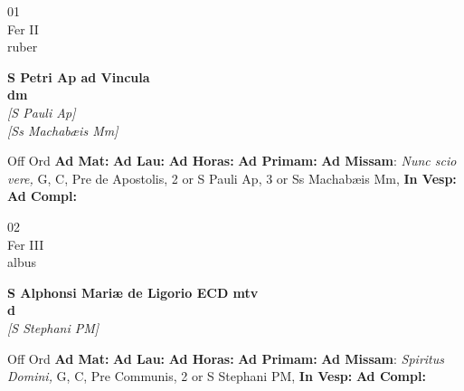 \documentclass[10pt, openany]{book}
\begin{document}
        \begin{center}
            \begin{minipage}{3.5in}
                \vspace{2em}
                \begin{minipage}{0.5in}
                    {\Huge 01} \\
                    {\normalsize Fer II} \\
                    {\normalsize ruber}
                \end{minipage}
                \begin{minipage}{3.0in}
                    \textbf{ \large S Petri Ap ad Vincula \\
                    \textnormal{\normalsize dm}} \\ \textit{[S Pauli Ap]} \\ \textit{[Ss Machabæis Mm]} \\ 
                \end{minipage}
                \begin{justify}Off Ord
                    \textbf{Ad Mat: }
                    \textbf{Ad Lau: }
                    \textbf{Ad Horas: }
                    \textbf{Ad Primam: }\textbf{Ad Missam}: \textit{Nunc scio vere,} G, C, Pre de Apostolis, 2 or S Pauli Ap, 3 or Ss Machabæis Mm,  
                    \textbf{In Vesp: }
                    \textbf{Ad Compl: }
                \end{justify}
            \end{minipage}
        \end{center}
    
        \begin{center}
            \begin{minipage}{3.5in}
                \vspace{2em}
                \begin{minipage}{0.5in}
                    {\Huge 02} \\
                    {\normalsize Fer III} \\
                    {\normalsize albus}
                \end{minipage}
                \begin{minipage}{3.0in}
                    \textbf{ \large S Alphonsi Mariæ de Ligorio ECD mtv \\
                    \textnormal{\normalsize d}} \\ \textit{[S Stephani PM]} \\ 
                \end{minipage}
                \begin{justify}Off Ord
                    \textbf{Ad Mat: }
                    \textbf{Ad Lau: }
                    \textbf{Ad Horas: }
                    \textbf{Ad Primam: }\textbf{Ad Missam}: \textit{Spiritus Domini,} G, C, Pre Communis, 2 or S Stephani PM,  
                    \textbf{In Vesp: }
                    \textbf{Ad Compl: }
                \end{justify}
            \end{minipage}
        \end{center}
    
\end{document}
